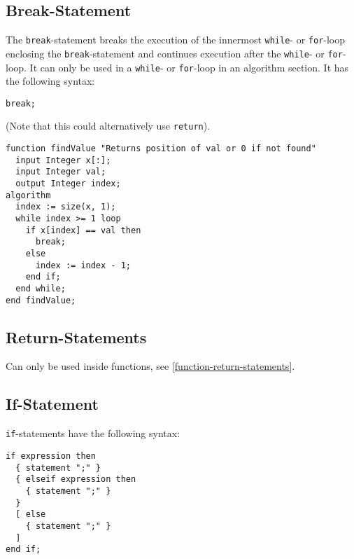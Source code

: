 \subsection{Break-Statement}\label{break-statement}

The \lstinline!break!-statement breaks the execution of the innermost \lstinline!while!- or \lstinline!for!-loop enclosing the \lstinline!break!-statement and continues execution after the \lstinline!while!- or \lstinline!for!-loop.
It can only be used in a \lstinline!while!- or \lstinline!for!-loop in an algorithm section.
It has the following syntax:
\begin{lstlisting}[language=modelica]
break;
\end{lstlisting}

\begin{example}
(Note that this could alternatively use \lstinline!return!).
\begin{lstlisting}[language=modelica]
function findValue "Returns position of val or 0 if not found"
  input Integer x[:];
  input Integer val;
  output Integer index;
algorithm
  index := size(x, 1);
  while index >= 1 loop
    if x[index] == val then
      break;
    else
      index := index - 1;
    end if;
  end while;
end findValue;
\end{lstlisting}
\end{example}

\subsection{Return-Statements}\label{return-statements}

Can only be used inside functions, see \cref{function-return-statements}.

\subsection{If-Statement}\label{if-statement}

\lstinline!if!-statements have the following syntax:
\begin{lstlisting}[language=grammar]
if expression then
  { statement ";" }
  { elseif expression then
    { statement ";" }
  }
  [ else
    { statement ";" }
  ]
end if;
\end{lstlisting}

